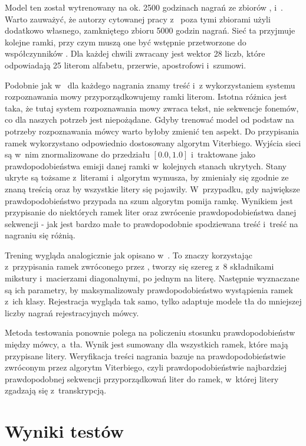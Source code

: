 Model ten został wytrenowany na ok. 2500 godzinach nagrań ze zbiorów , 
i~. Warto zauważyć, że autorzy cytowanej pracy z~ poza tymi zbiorami użyli
dodatkowo własnego, zamkniętego zbioru 5000 godzin nagrań. Sieć ta przyjmuje kolejne ramki, przy czym muszą
one być wstępnie przetworzone do współczynników . Dla każdej chwili zwracany jest wektor 28 liczb,
które odpowiadają 25 literom alfabetu, przerwie, apostrofowi i~szumowi.

Podobnie jak w~ dla każdego nagrania znamy treść i~z wykorzystaniem systemu rozpoznawania
mowy przyporządkowujemy ramki literom. Istotna różnica jest taka, że tutaj system rozpoznawania mowy zwraca
tekst, nie sekwencje fonemów, co dla naszych potrzeb jest niepożądane. Gdyby trenować model od podstaw na
potrzeby rozpoznawania mówcy warto byłoby zmienić ten aspekt. Do przypisania ramek wykorzystano odpowiednio
dostosowany algorytm Viterbiego. Wyjścia sieci są w~nim znormalizowane do przedziału $[0.0, 1.0]$ i~traktowane
jako prawdopodobieństwa emisji danej ramki w~kolejnych stanach ukrytych. Stany ukryte są tożsame z~literami
i~algorytm wymusza, by zmieniały się zgodnie ze znaną treścią oraz by wszystkie litery się pojawiły.
W~przypadku, gdy największe prawdopodobieństwo przypada na szum algorytm pomija ramkę. Wynikiem
jest przypisanie do niektórych ramek liter oraz zwrócenie prawdopodobieństwa danej sekwencji - jak jest
bardzo małe to prawdopodobnie spodziewana treść i~treść na nagraniu się różnią.

Trening wygląda analogicznie jak opisano w~. To znaczy korzystając z~przypisania ramek
zwróconego przez , tworzy się szereg  z~$8$ składnikami mikstury
i~macierzami diagonalnymi, po jednym na literę. Następnie wyznaczane są ich parametry, by
maksymalizowały prawdopodobieństwo wystąpienia
ramek z~ich klasy. Rejestracja wygląda tak samo, tylko  adaptuje modele tła do
mniejszej liczby nagrań rejestracyjnych mówcy.

Metoda testowania ponownie polega na policzeniu stosunku prawdopodobieństw między  mówcy, a~tła.
Wynik jest sumowany dla wszystkich ramek, które mają przypisane litery. Weryfikacja treści nagrania
bazuje na prawdopodobieństwie zwróconym przez algorytm Viterbiego, czyli prawdopodobieństwie najbardziej
prawdopodobnej sekwencji przyporządkowań liter do ramek, w~której litery zgadzają się z~transkrypcją.

\section{Wyniki testów}
\label{sec:test_results}

